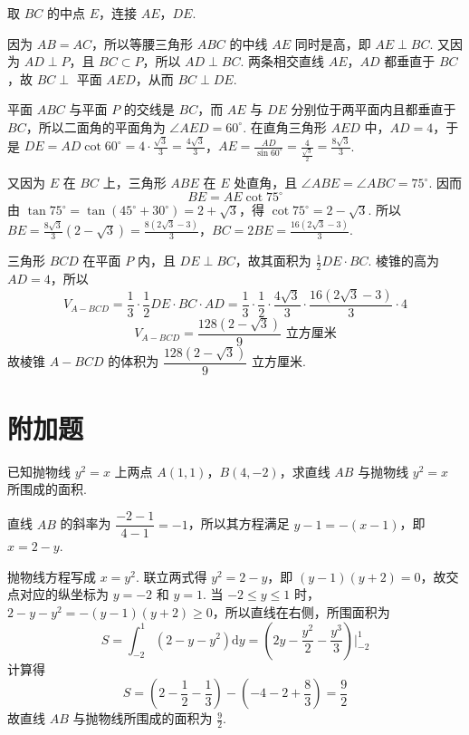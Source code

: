 \begin{solution}
取 \(BC\) 的中点 \(E\)，连接 \(AE\)，\(DE\).


因为 \(AB=AC\)，所以等腰三角形 \(ABC\) 的中线 \(AE\) 同时是高，即 \(AE\perp BC\). 又因为 \(AD\perp P\)，且 \(BC\subset P\)，所以 \(AD\perp BC\). 两条相交直线 \(AE\)，\(AD\) 都垂直于 \(BC\)，故 \(BC\perp\) 平面 \(AED\)，从而 \(BC\perp DE\).

平面 \(ABC\) 与平面 \(P\) 的交线是 \(BC\)，而 \(AE\) 与 \(DE\) 分别位于两平面内且都垂直于 \(BC\)，所以二面角的平面角为 \(\angle AED=60^\circ\). 在直角三角形 \(AED\) 中，\(AD=4\)，于是
\(DE=AD\cot60^\circ=4\cdot\frac{\sqrt{3}}{3}=\frac{4\sqrt{3}}{3}\)，\(AE=\frac{AD}{\sin60^\circ}=\frac{4}{\frac{\sqrt{3}}{2}}=\frac{8\sqrt{3}}{3}\).

又因为 \(E\) 在 \(BC\) 上，三角形 \(ABE\) 在 \(E\) 处直角，且 \(\angle ABE=\angle ABC=75^\circ\). 因而
\[
BE=AE\cot75^\circ
\]
由 \(\tan75^\circ=\tan(45^\circ+30^\circ)=2+\sqrt{3}\)，得 \(\cot75^\circ=2-\sqrt{3}\). 所以
\(BE=\frac{8\sqrt{3}}{3}(2-\sqrt{3})=\frac{8(2\sqrt{3}-3)}{3}\)，\(BC=2BE=\frac{16(2\sqrt{3}-3)}{3}\).

三角形 \(BCD\) 在平面 \(P\) 内，且 \(DE\perp BC\)，故其面积为 \(\frac{1}{2}DE\cdot BC\). 棱锥的高为 \(AD=4\)，所以
\[
V_{A-BCD}=\frac{1}{3}\cdot\frac{1}{2}DE\cdot BC\cdot AD
=\frac{1}{3}\cdot\frac{1}{2}\cdot\frac{4\sqrt{3}}{3}\cdot\frac{16(2\sqrt{3}-3)}{3}\cdot4
\]
\[
V_{A-BCD}=\frac{128(2-\sqrt{3})}{9}\text{ 立方厘米}
\]
故棱锥 \(A-BCD\) 的体积为 \(\dfrac{128(2-\sqrt{3})}{9}\text{ 立方厘米}\).
\end{solution}

\section{附加题}

\begin{problem}
已知抛物线 \(y^2=x\) 上两点 \(A(1,1)\)，\(B(4,-2)\)，求直线 \(AB\) 与抛物线 \(y^2=x\) 所围成的面积.

\end{problem}

\begin{solution}
直线 \(AB\) 的斜率为 \(\dfrac{-2-1}{4-1}=-1\)，所以其方程满足 \(y-1=-(x-1)\)，即 \(x=2-y\).

抛物线方程写成 \(x=y^2\). 联立两式得 \(y^2=2-y\)，即 \((y-1)(y+2)=0\)，故交点对应的纵坐标为 \(y=-2\) 和 \(y=1\). 当 \(-2\leqslant y\leqslant1\) 时，
\(2-y-y^2=-(y-1)(y+2)\geqslant0\)，所以直线在右侧，所围面积为
\[
S=\int_{-2}^{1}\left(2-y-y^2\right)\mathrm{d}y
=\left(2y-\frac{y^2}{2}-\frac{y^3}{3}\right)\Bigg|_{-2}^{1}
\]
计算得
\[
S=\left(2-\frac{1}{2}-\frac{1}{3}\right)-\left(-4-2+\frac{8}{3}\right)=\frac{9}{2}
\]
故直线 \(AB\) 与抛物线所围成的面积为 \(\frac{9}{2}\).
\end{solution}
